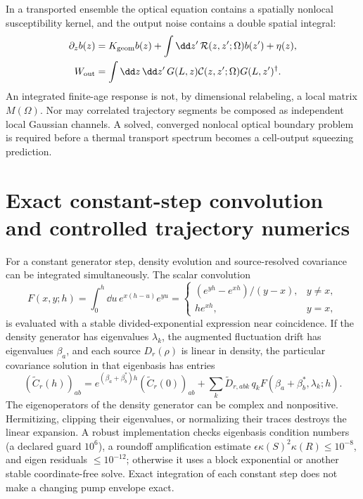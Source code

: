 In a transported ensemble the optical equation contains a spatially nonlocal
susceptibility kernel, and the output noise contains a double spatial
integral:
\begin{align}
 \partial_z b(z)&=K_{\rm geom}b(z)+
   \int\dd z'\,\mathcal R(z,z';\Omega)b(z')+\eta(z),\nonumber\\
 W_{\rm out}&=\int\dd z\,\dd z'\,
 G(L,z)\mathcal C(z,z';\Omega)G(L,z')^\dagger.
 \label{eq:gc-nonlocal-maxwell}
\end{align}
An integrated finite-age response is not, by dimensional relabeling, a local
matrix $M(\Omega)$. Nor may correlated trajectory segments be composed as
independent local Gaussian channels. A solved, converged nonlocal optical
boundary problem is required before a thermal transport spectrum becomes a
cell-output squeezing prediction.

\section{Exact constant-step convolution and controlled trajectory numerics}
\label{sec:gc-numerics}

For a constant generator step, density evolution and source-resolved covariance
can be integrated simultaneously. The scalar convolution
\begin{equation}
 F(x,y;h)=\int_0^h\dd u\,e^{x(h-u)}e^{yu}
 =\begin{cases}(e^{yh}-e^{xh})/(y-x),&y\ne x,\\
 he^{xh},&y=x,
 \end{cases}
 \label{eq:gc-divided-exponential}
\end{equation}
is evaluated with a stable divided-exponential expression near coincidence.
If the density generator has eigenvalues $\lambda_k$, the augmented
fluctuation drift has eigenvalues $\beta_a$, and each source $D_r(\rho)$
is linear in density, the particular covariance solution in that eigenbasis
has entries
\begin{equation}
 (\widetilde C_r(h))_{ab}
 =e^{(\beta_a+\beta_b^*)h}(\widetilde C_r(0))_{ab}
 +\sum_k\widetilde D_{r,abk}\,q_k
      F(\beta_a+\beta_b^*,\lambda_k;h).
 \label{eq:gc-exact-step}
\end{equation}
The eigenoperators of the density generator can be complex and nonpositive.
Hermitizing, clipping their eigenvalues, or normalizing their traces destroys
the linear expansion. A robust implementation checks eigenbasis condition
numbers (a declared guard $10^6$), a roundoff amplification estimate
$\epsilon\kappa(S)^2\kappa(R)\leq10^{-8}$, and eigen residuals
$\leq10^{-12}$; otherwise it uses a block exponential or another stable
coordinate-free solve. Exact integration of each constant step does not make
a changing pump envelope exact.

